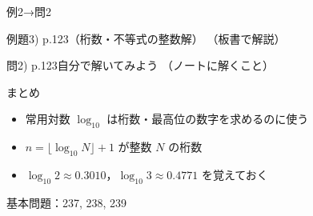 \documentclass[aspectratio=43,professionalfonts,handout]{beamer}
\begin{document}
\begin{frame}{例2→問2}
  \begin{exampleblock}{例題3) p.123（桁数・不等式の整数解）}
    （板書で解説）
  \end{exampleblock}

  \vfill

  \begin{block}{問2) p.123\quad 自分で解いてみよう}
    （ノートに解くこと）
  \end{block}
\end{frame}

\begin{frame}{まとめ}
  \begin{itemize}
    \item 常用対数 $\log_{10}$ は桁数・最高位の数字を求めるのに使う
    \item $n = \lfloor \log_{10} N \rfloor + 1$ が整数 $N$ の桁数
    \item $\log_{10} 2 \approx 0.3010$，$\log_{10} 3 \approx 0.4771$ を覚えておく
  \end{itemize}

  \vfill
  {\small 基本問題：237, 238, 239}
\end{frame}
\end{document}

